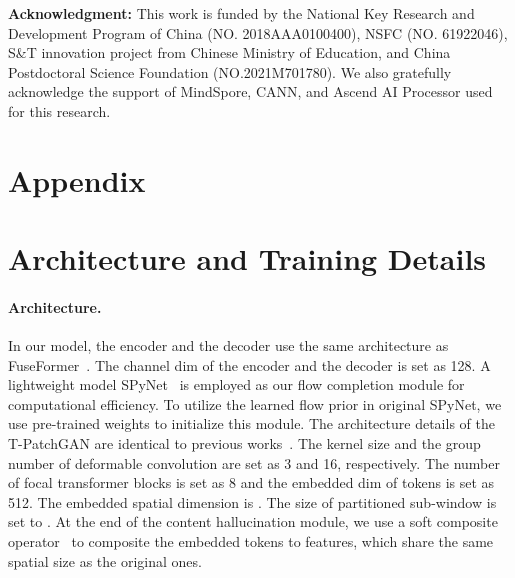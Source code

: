 \documentclass[final]{cvpr}
\begin{document}
\noindent\textbf{Acknowledgment:}
This work is funded by the National Key Research and Development Program of China (NO. 2018AAA0100400),
NSFC (NO. 61922046),
S\&T innovation project from Chinese Ministry of Education,
and China Postdoctoral Science Foundation (NO.2021M701780).
We also gratefully acknowledge the support of MindSpore, 
CANN, and Ascend AI Processor used for this research. 
{\small


}

\appendix
\section*{Appendix}
\section{Architecture and Training Details}
\paragraph{Architecture.}
In our model, the encoder and the decoder use the same architecture as FuseFormer~\cite{Liu_2021_FuseFormer}.
The channel dim  of the encoder and the decoder is set as 128.
A lightweight model SPyNet~\cite{ranjan2017optical} is employed as our flow completion module for computational efficiency. 
To utilize the learned flow prior in original SPyNet, we use pre-trained weights to initialize this module.
The architecture details of the T-PatchGAN are identical to previous works~\cite{chang2019free,yan2020sttn,Liu_2021_FuseFormer}.
The kernel size  and the group number  of deformable convolution are set as 3 and 16, respectively.
The number of focal transformer blocks  is set as 8 and the embedded dim of tokens  is set as 512.
The embedded spatial dimension  is .
The size of partitioned sub-window  is set to .
At the end of the content hallucination module, we use a soft composite operator~\cite{Liu_2021_FuseFormer} to composite the embedded tokens to features, which share the same spatial size as the original ones.
\end{document}
